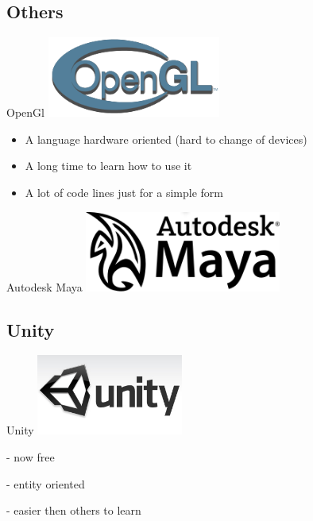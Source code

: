 \documentclass[a4paper,10pt]{beamer}
\begin{document}
		\subsection{Others}
			
			\begin{frame}{OpenGl}
				\includegraphics[height=75pt]{images/OpenGL_logo.png}
				\begin{itemize}
					\item A language hardware oriented (hard to change of devices)
					\item A long time to learn how to use it
					\item A lot of code lines just for a simple form
				\end{itemize}
			\end{frame}
			
			\begin{frame}{Autodesk Maya}
				\includegraphics[height=75pt]{images/Autodesk_Maya.png}
			\end{frame}
			
		\subsection{Unity}
		
			\begin{frame}{Unity}
				\includegraphics[height=75pt]{images/Logo_Unity.jpg}
			
				- now free
				
				- entity oriented
				
				- easier then others to learn
			\end{frame}
			
\end{document}
